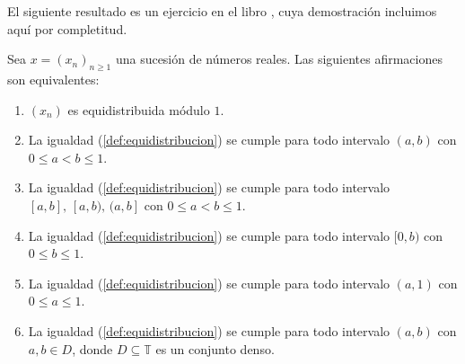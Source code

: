 
El siguiente resultado es un ejercicio en el libro \cite[Ejercicios 1.1-1.5]{kuipers-1974}, cuya demostración incluimos aquí por completitud.

\begin{proposition}
    \label{def:equivalentes}
    Sea $x=(x_n)_{n\geq1}$ una sucesión de números reales.
    Las siguientes afirmaciones son equivalentes:
    \begin{enumerate}
        \item $(x_n)$ es equidistribuida módulo $1$.

        \item La igualdad (\ref{def:equidistribucion}) se cumple
        para todo intervalo $(a,b)$ con $0 \leq a < b \leq 1$.

        \item La igualdad (\ref{def:equidistribucion}) se cumple
        para todo intervalo $[a,b], \,[a,b), \,(a,b]$ con $0 \leq a < b \leq 1$.

        \item La igualdad (\ref{def:equidistribucion}) se cumple
        para todo intervalo $[0,b)$ con $0 \leq b \leq 1$.

        \item La igualdad (\ref{def:equidistribucion}) se cumple
        para todo intervalo $(a,1)$ con $0 \leq a \leq 1$.

        \item La igualdad (\ref{def:equidistribucion}) se cumple
        para todo intervalo $(a,b)$ con $a,b\in D$, donde $D \subseteq \mathbb{T}$ es un conjunto denso.
    \end{enumerate}
\end{proposition}

